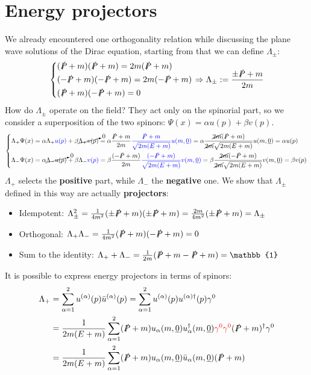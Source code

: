 \documentclass[../main.tex]{subfiles}
\begin{document}
\section{Energy projectors}
We already encountered one orthogonality relation while discussing the plane wave solutions of the Dirac equation, starting from that we can define $\Lambda_\pm$:
\[
\left\{
\begin{aligned}
&(\slashed{P}+m)(\slashed{P}+m)=2m(\slashed{P}+m)\\
&(-\slashed{P}+m)(-\slashed{P}+m)=2m(-\slashed{P}+m)\\
&(\slashed{P}+m)(-\slashed{P}+m)=0
\end{aligned}
\right.
\Rightarrow\Lambda_\pm:=\frac{\pm\slashed{P}+m}{2m}
\]
How do $\Lambda_\pm$ operate on the field? They act only on the spinorial part, so we consider a superposition of the two spinors: $\Psi(x)=\alpha u(p)+\beta v(p)$.
\[
\left\{
\begin{aligned}
\Lambda_+\Psi(x)&=\alpha\Lambda_+{\color{blue}u(p)}+\beta\cancelto{0}{\Lambda_+v(p)}=\alpha\frac{\slashed{P}+m}{2m}{\color{blue}\frac{\slashed{P}+m}{\sqrt{2m(E+m)}}u(m,\underline{0})}=\alpha\frac{\cancel{2m}(\slashed{P}+m)}{\cancel{2m}\sqrt{2m(E+m)}}u(m,\underline{0})=\alpha u(p)\\
\Lambda_-\Psi(x)&=\alpha\cancelto{0}{\Lambda_-u(p)}+\beta\Lambda_-{\color{blue}v(p)}=\beta\frac{(-\slashed{P}+m)}{2m}{\color{blue}\frac{(-\slashed{P}+m)}{\sqrt{2m(E+m)}}v(m,\underline{0})}=\beta\frac{\cancel{2m}(-\slashed{P}+m)}{\cancel{2m}\sqrt{2m(E+m)}}v(m,\underline{0})=\beta v(p)
\end{aligned}
\right.
\]
$\Lambda_+$ selects the \textbf{positive} part, while $\Lambda_-$ the \textbf{negative} one. We show that $\Lambda_\pm$ defined in this way are actually \textbf{projectors}:
\begin{itemize}
    \item Idempotent: $\Lambda^2_\pm=\frac{1}{4m^2}(\pm\slashed{P}+m)(\pm\slashed{P}+m)=\frac{2m}{4m^2}(\pm\slashed{P}+m)=\Lambda_\pm$
    \item Orthogonal: $\Lambda_+\Lambda_-=\frac{1}{4m^2}(\slashed{P}+m)(-\slashed{P}+m)=0$
    \item Sum to the identity: $\Lambda_++\Lambda_-=\frac{1}{2m}(\slashed{P}+m-\slashed{P}+m)=\mathbb{1}$
\end{itemize}
It is possible to express energy projectors in terms of spinors:
\begin{align*}
\Lambda_+&=\sum_{\alpha=1}^2 u^{(\alpha)}(p)\bar{u}^{(\alpha)}(p)=\sum_{\alpha=1}^2 u^{(\alpha)}(p)u^{(\alpha)\dagger}(p)\gamma^0\\
&=\frac{1}{2m(E+m)}\sum_{\alpha=1}^2(\slashed{P}+m)u_\alpha(m,\underline{0}) u^\dagger_\alpha(m,\underline{0}){\color{red}\gamma^0\gamma^0}(\slashed{P}+m)^\dagger\gamma^0\\
&=\frac{1}{2m(E+m)}\sum_{\alpha=1}^2(\slashed{P}+m)u_\alpha(m,\underline{0})\bar{u}_\alpha(m,\underline{0})(\slashed{P}+m)
\end{align*}
\end{document}
